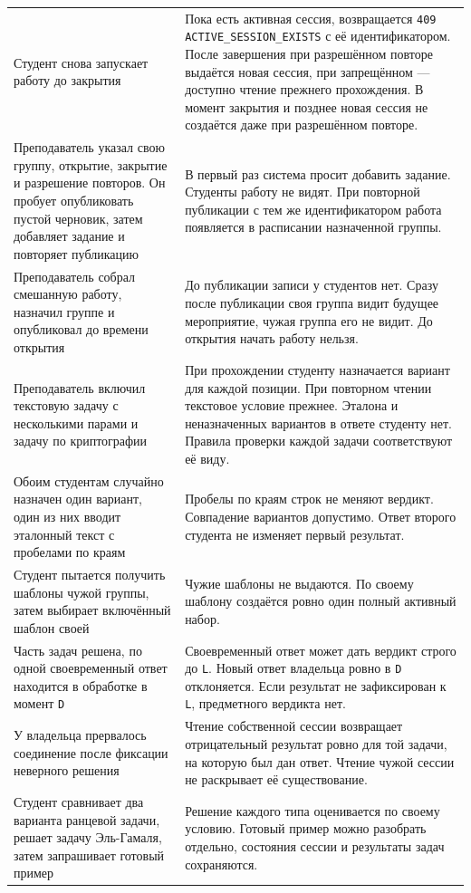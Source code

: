 \documentclass[12pt,a4paper]{article}
\begin{document}
{\begin{longtable}[]{@{}
  >{\raggedright\arraybackslash}p{}
  >{\raggedright\arraybackslash}p{}@{}}
Студент снова запускает работу до закрытия & Пока есть активная сессия, возвращается \texttt{409 ACTIVE\_\allowbreak{}SESSION\_\allowbreak{}EXISTS} с её идентификатором. После завершения при разрешённом повторе выдаётся новая сессия, при запрещённом --- доступно чтение прежнего прохождения. В момент закрытия и позднее новая сессия не создаётся даже при разрешённом повторе. \\
Преподаватель указал свою группу, открытие, закрытие и разрешение повторов. Он пробует опубликовать пустой черновик, затем добавляет задание и повторяет публикацию & В первый раз система просит добавить задание. Студенты работу не видят. При повторной публикации с тем же идентификатором работа появляется в расписании назначенной группы. \\
Преподаватель собрал смешанную работу, назначил группе и опубликовал до времени открытия & До публикации записи у студентов нет. Сразу после публикации своя группа видит будущее мероприятие, чужая группа его не видит. До открытия начать работу нельзя. \\
Преподаватель включил текстовую задачу с несколькими парами и задачу по криптографии & При прохождении студенту назначается вариант для каждой позиции. При повторном чтении текстовое условие прежнее. Эталона и неназначенных вариантов в ответе студенту нет. Правила проверки каждой задачи соответствуют её виду. \\
Обоим студентам случайно назначен один вариант, один из них вводит эталонный текст с пробелами по краям & Пробелы по краям строк не меняют вердикт. Совпадение вариантов допустимо. Ответ второго студента не изменяет первый результат. \\
Студент пытается получить шаблоны чужой группы, затем выбирает включённый шаблон своей & Чужие шаблоны не выдаются. По своему шаблону создаётся ровно один полный активный набор. \\
Часть задач решена, по одной своевременный ответ находится в обработке в момент \texttt{D} & Своевременный ответ может дать вердикт строго до \texttt{L}. Новый ответ владельца ровно в \texttt{D} отклоняется. Если результат не зафиксирован к \texttt{L}, предметного вердикта нет. \\
У владельца прервалось соединение после фиксации неверного решения & Чтение собственной сессии возвращает отрицательный результат ровно для той задачи, на которую был дан ответ. Чтение чужой сессии не раскрывает её существование. \\
Студент сравнивает два варианта ранцевой задачи, решает задачу Эль-Гамаля, затем запрашивает готовый пример & Решение каждого типа оценивается по своему условию. Готовый пример можно разобрать отдельно, состояния сессии и результаты задач сохраняются. \\

\end{longtable}}
\end{document}
